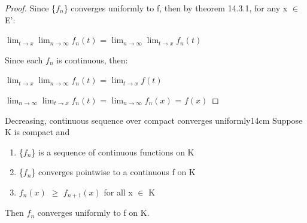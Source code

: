     \vspace{0.1cm}
    
    \begin{proof}
        Since \{$f_n$\} converges uniformly to f, then by {\color{red} theorem 14.3.1},
        for any x $\in$ E':

        \hspace{0.5cm}
        $\lim_{t \rightarrow x} \lim_{n \rightarrow \infty} f_n(t)$
        = $\lim_{n \rightarrow \infty} \lim_{t \rightarrow x} f_n(t)$

        Since each $f_n$ is continuous, then:

        \hspace{0.5cm}
        $\lim_{t \rightarrow x} \lim_{n \rightarrow \infty} f_n(t)$
        = $\lim_{t \rightarrow x} f(t)$

        \hspace{0.5cm}
        $\lim_{n \rightarrow \infty} \lim_{t \rightarrow x} f_n(t)$
        = $\lim_{n \rightarrow \infty} f_n(x)$ = $f(x)$
    \end{proof}

    \newpage



    \begin{wtheorem}{Decreasing, continuous sequence over compact
    converges uniformly}{14cm}
        Suppose K is compact and

        \begin{enumerate}[label=(\alph*), leftmargin=1cm, itemsep=0.1cm]
            \item \{$f_n$\} is a sequence of continuous functions on K
            
            \item \{$f_n$\} converges pointwise to a continuous f on K
            
            \item $f_n(x)$ $\geq$ $f_{n+1}(x)$ for all x $\in$ K
        \end{enumerate}

        Then $f_n$ converges uniformly to f on K.    
    \end{wtheorem}

